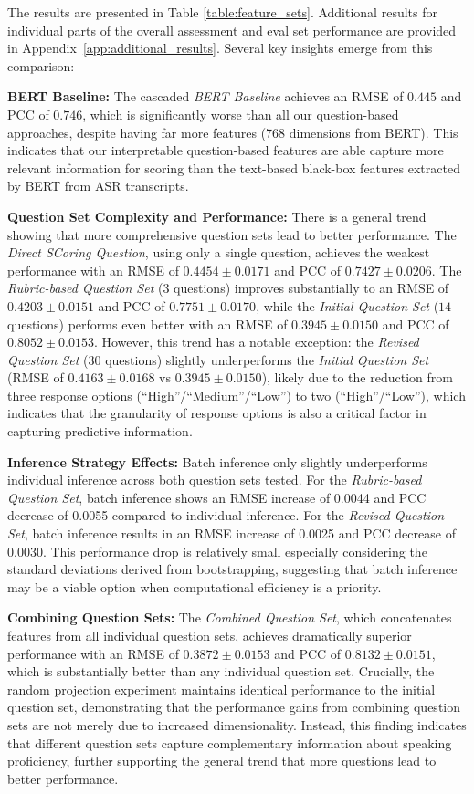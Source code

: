 \documentclass{report}
\begin{document}
The results are presented in Table \ref{table:feature_sets}. Additional results for individual parts of the overall assessment and eval set performance are provided in Appendix~\ref{app:additional_results}. Several key insights emerge from this comparison:

\textbf{BERT Baseline:} The cascaded \emph{BERT Baseline} achieves an RMSE of $0.445$ and PCC of $0.746$, which is significantly worse than all our question-based approaches, despite having far more features (768 dimensions from BERT). This indicates that our interpretable question-based features are able capture more relevant information for scoring than the text-based black-box features extracted by BERT from ASR transcripts.

\textbf{Question Set Complexity and Performance:} There is a general trend showing that more comprehensive question sets lead to better performance. The \emph{Direct SCoring Question}, using only a single question, achieves the weakest performance with an RMSE of $0.4454 \pm 0.0171$ and PCC of $0.7427 \pm 0.0206$. The \emph{Rubric-based Question Set} ($3$ questions) improves substantially to an RMSE of $0.4203 \pm 0.0151$ and PCC of $0.7751 \pm 0.0170$, while the \emph{Initial Question Set} ($14$ questions) performs even better with an RMSE of $0.3945 \pm 0.0150$ and PCC of $0.8052 \pm 0.0153$. However, this trend has a notable exception: the \emph{Revised Question Set} ($30$ questions) slightly underperforms the \emph{Initial Question Set} (RMSE of $0.4163 \pm 0.0168$ vs $0.3945 \pm 0.0150$), likely due to the reduction from three response options (``High''/``Medium''/``Low'') to two (``High''/``Low''), which indicates that the granularity of response options is also a critical factor in capturing predictive information.

\textbf{Inference Strategy Effects:} Batch inference only slightly underperforms individual inference across both question sets tested. For the \emph{Rubric-based Question Set}, batch inference shows an RMSE increase of 0.0044 and PCC decrease of 0.0055 compared to individual inference. For the \emph{Revised Question Set}, batch inference results in an RMSE increase of 0.0025 and PCC decrease of 0.0030. This performance drop is relatively small especially considering the standard deviations derived from bootstrapping, suggesting that batch inference may be a viable option when computational efficiency is a priority.

\textbf{Combining Question Sets:} The \emph{Combined Question Set}, which concatenates features from all individual question sets, achieves dramatically superior performance with an RMSE of $0.3872 \pm 0.0153$ and PCC of $0.8132 \pm 0.0151$, which is substantially better than any individual question set. Crucially, the random projection experiment maintains identical performance to the initial question set, demonstrating that the performance gains from combining question sets are not merely due to increased dimensionality. Instead, this finding indicates that different question sets capture complementary information about speaking proficiency, further supporting the general trend that more questions lead to better performance.
\end{document}
